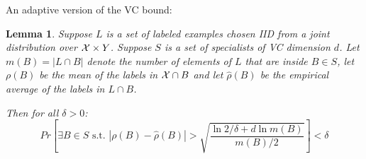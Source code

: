 \documentclass{article}
\newtheorem{lemma}[theorem]{Lemma}
\newcommand{\X}{{\cal X}}
\newcommand{\emprho}{\hat{\rho}}
\begin{document}
An adaptive version of the VC bound:
\begin{lemma}
Suppose $L$ is a set of labeled examples chosen IID from a
joint distribution over $\X \times Y$. Suppose $S$ is a set of
specialists of VC dimension $d$.
Let $m(B)=|L \cap B|$ denote the number of elements of $L$ that are
inside $B \in S$, let $\rho(B)$ be the mean of the labels in $\X \cap B$ and
let $\emprho(B)$ be the empirical average of the labels in $L \cap B$. 

Then for all $\delta>0$:
$$
Pr\left[ \exists B\in S \text{ s.t. }  |\rho(B) - \emprho(B)| >
  \sqrt{\frac{\ln 2/\delta+d \ln m(B)}{m(B)/2}} \right] < \delta
$$
\end{lemma}
\end{document}
